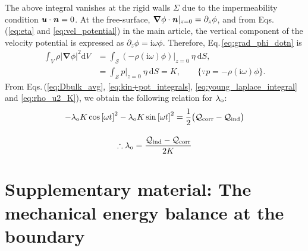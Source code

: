 \documentclass[aps,prfluids,reprint,superscriptaddress]{revtex4-2}
\newcommand{\h}[1]{\textbf{\textit{#1}}}
\newcommand{\ii}[1]{\text{#1}}
\newcommand{\nn}{\nonumber}
\newcommand{\mref}[1]{{\hypersetup{linkcolor=black}\ref{#1}}}
\numberwithin{equation}{section}
\begin{document}
The above integral vanishes at the rigid walls $\Sigma$ due to the impermeability condition $\h u \cdot \h n=0$. At the free-surface, $\bm\nabla\phi\cdot \h n|_{z=0} = \partial_z\phi$, and from Eqs.\,(\mref{eq:eta} and \mref{eq:vel_potential}) in the main article, the vertical component of the velocity potential is expressed as $\partial_z\phi = \ii i \omega \phi$. Therefore, Eq.\,\eqref{eq:grad_phi_dotn} is
 \begin{align}
 	\nn
 	\int_{V}\rho |\bm\nabla \phi|^2 \mathrm dV &= \int_{\mathcal{S}} \left(
 	-\rho(\ii i\omega)\phi
 	\right)|_{z=0} \: \eta \:\mathrm dS,
 	\\
 	&= \int_{\mathcal{S}}
 	 p|_{z=0} \: \eta \: \mathrm dS = K, 
 	\qquad \{ \because p = -\rho(\ii i\omega)\phi \}.
 	\label{eq:rho_u2_K}
 \end{align}
From Eqs.\,(\ref{eq:Dbulk_avg}, \ref{eq:kin+pot_integrals}, \ref{eq:young_laplace_integral} and \ref{eq:rho_u2_K}), we obtain the following relation for $\lambda_{\rm o}$:
\begin{gather}
	-\lambda_{\rm o} K \cos{[\omega t]}^2 - \lambda_{\rm o} K \sin{[\omega t]}^2  =   \frac{1}{2} \bigl(\mathcal{Q}_{\rm corr} - \mathcal{Q}_{\rm ind} \bigr)
	\\[10pt]
	\therefore 
	\lambda_{\rm o} = \dfrac{\mathcal{Q}_{\rm ind} - \mathcal{Q}_{\rm corr}}{2K}
\end{gather}


\section{Supplementary material: The mechanical energy balance at the boundary} 
\label{supplC}
\end{document}
